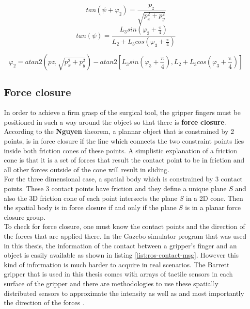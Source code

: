 \[
tan \left( ψ + φ_2 \right) = \frac{p_z}{\sqrt{p_x^2 + p_y^2}}
\]
\[
tan \left( ψ \right) = \frac{L_3 sin \left( φ_3 + \frac{π}{4} \right) }{L_2 + L_3 cos \left( φ_3 + \frac{π}{4} \right)}
\]

\begin{equation}
φ_2 = atan2 \left( pz, \sqrt{p_x^2 + p_y^2} \right) - atan2 \left[ L_3 sin \left( φ_3 + \frac{π}{4} \right), L_2 + L_3 cos \left( φ_3 + \frac{π}{4} \right) \right]
\end{equation}

\subsection{Force closure}

In order to achieve a firm grasp of the surgical tool, the gripper fingers must be positioned in such a way around the object so that there is \textbf{force closure}. According to the \textbf{Nguyen} theorem, a plannar 
object that is constrained by 2 points, is in force closure if the line which connects the two constraint points lies inside both friction cones of these points. A simplistic explanation of a friction cone is 
that it is a set of forces that result the contact point to be in friction and all other forces outside of the cone will result in sliding. \\

For the three dimensional case, a spatial body which is constrained by 3 contact points. These 3 contact points have friction and they define a unique plane $S$ and also the 3D friction cone of each point 
intersects the plane $S$ in a 2D cone. Then the spatial body is in force closure if and only if the plane $S$ is in a planar force closure group.\\

To check for force closure, one must know the contact points and the direction of the forces that are applied there. In the Gazebo simulator program that was used in this thesis, the information of the contact 
between a gripper's finger and an object is easily available as shown in listing \ref{list:ros-contact-msg}. However this kind of information is much harder to acquire in real scenarios. The Barrett gripper that is used in this thesis comes with arrays 
of tactile sensors in each surface of the gripper and there are methodologies to use these spatially distributed sensors to approximate the intensity as well as and most importantly the direction of the forces \cite{tactile-sensors-force}.

